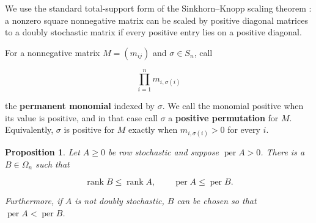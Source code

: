 \documentclass[11pt]{article}
\newtheorem{proposition}[theorem]{Proposition}
\theoremstyle{remark}
\begin{document}
We use the standard total-support form of the Sinkhorn--Knopp scaling
theorem \cite{sinkhornknopp1967}: a nonzero square nonnegative matrix can be
scaled by positive
diagonal matrices to a doubly stochastic matrix if every positive entry lies
on a positive diagonal.

For a nonnegative matrix \(M=(m_{ij})\) and \(\sigma\in S_n\), call

\[
 \prod_{i=1}^n m_{i,\sigma(i)}
\]

the \textbf{permanent monomial} indexed by \(\sigma\). We call the monomial
positive when its value is positive, and in that case call \(\sigma\) a
\textbf{positive permutation} for \(M\). Equivalently, \(\sigma\) is positive
for \(M\) exactly when \(m_{i,\sigma(i)}>0\) for every \(i\).

\begin{proposition}
Let \(A\geq0\) be row
stochastic and suppose \(\operatorname{per}A>0\). There is a
\(B\in\Omega_n\) such that

\[
 \operatorname{rank}B\leq\operatorname{rank}A,
 \qquad
 \operatorname{per}A\leq\operatorname{per}B.               \tag{2.6}
\]

Furthermore, if \(A\) is not doubly stochastic, \(B\) can be chosen so that
\(\operatorname{per}A<\operatorname{per}B\).
\end{proposition}
\end{document}
